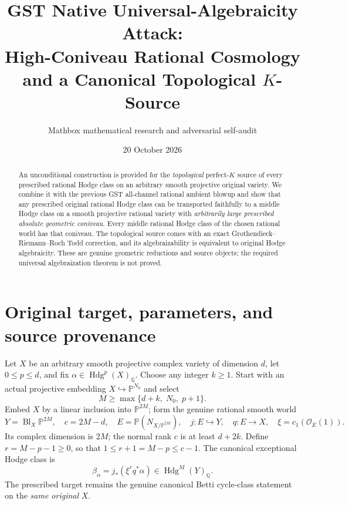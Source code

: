 \documentclass[11pt]{article}
\title{GST Native Universal-Algebraicity Attack:\\
High-Coniveau Rational Cosmology and a Canonical Topological \(K\)-Source}
\author{Mathbox mathematical research and adversarial self-audit}
\date{20 October 2026}
\newcommand{\Q}{\mathbb Q}
\newcommand{\Hdg}{\operatorname{Hdg}}
\begin{document}
\maketitle
\begin{abstract}
An unconditional construction is provided for the \emph{topological}
perfect-\(K\) source of every prescribed rational Hodge class on an
arbitrary smooth projective original variety. We combine it with the
previous GST all-channel rational ambient blowup and show that any
prescribed original rational Hodge class can be transported faithfully
to a middle Hodge class on a smooth projective rational variety
with \emph{arbitrarily large prescribed absolute geometric coniveau}.
Every middle rational Hodge class of the chosen rational world has
that coniveau. The topological source comes with an exact
Grothendieck--Riemann--Roch Todd correction, and its algebraizability
is equivalent to original Hodge algebraicity. These are genuine
geometric reductions and source objects; the required universal
algebraization theorem is not proved.
\end{abstract}

\section{Original target, parameters, and source provenance}
Let \(X\) be an arbitrary smooth projective complex variety of
dimension \(d\), let \(0\le p\le d\), and fix
\(\alpha\in\Hdg^p(X)_{\Q}\).
Choose any integer \(k\ge1\). Start with an actual
projective embedding \(X\hookrightarrow\mathbb P^{N_0}\)
and select
\[
 M\ge \max\{d+k,\;N_0,\;p+1\}. \tag{1.1}
\]
Embed \(X\) by a linear inclusion into \(\mathbb P^{2M}\);
form the genuine rational smooth world
\[
 Y=\operatorname{Bl}_X\mathbb P^{2M},\quad
 c=2M-d,\quad
 E=\mathbb P(N_{X/\mathbb P^{2M}}),\quad
 j:E\hookrightarrow Y,\quad q:E\to X,
 \quad\xi=c_1(\mathcal O_E(1)).
\]
Its complex dimension is \(2M\); the normal rank \(c\)
is at least \(d+2k\). Define
\(r=M-p-1\ge0\), so that \(1\le r+1=M-p\le c-1\).
The canonical exceptional Hodge class is
\[
 \boxed{\beta_{\alpha}=j_*(\xi^r q^*\alpha)
       \in \Hdg^M(Y)_{\Q}.} \tag{1.2}
\]
The prescribed target remains the genuine canonical Betti
cycle-class statement on the \emph{same original} \(X\).
\end{document}
